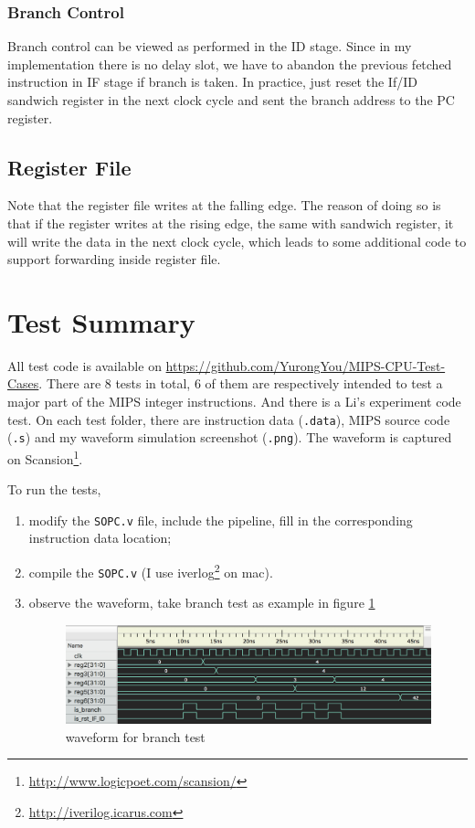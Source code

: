 \documentclass[paper=a4, fontsize=11pt]{scrartcl} %
\numberwithin{equation}{section} %
\numberwithin{figure}{section} %
\numberwithin{table}{section} %
\begin{document}
\begin{spacing}{1.5}
    	\subsubsection{Branch Control}
    		Branch control can be viewed as performed in the ID stage. Since in my implementation there is no delay slot, we have to abandon the previous fetched instruction in IF stage if branch is taken. In practice, just reset the If/ID sandwich register in the next clock cycle and sent the branch address to the PC register.
    \subsection{Register File}
    	Note that the register file writes at the falling edge. The reason of doing so is that if the register writes at the rising edge, the same with sandwich register, it will write the data in the next clock cycle, which leads to some additional code to support forwarding inside register file. 
\section{Test Summary}
	All test code is available on \url{https://github.com/YurongYou/MIPS-CPU-Test-Cases}. There are 8 tests in total, 6 of them are respectively intended to test a major part of the MIPS integer instructions. And there is a Li's experiment code test. On each test folder, there are instruction data (\verb|.data|), MIPS source code (\verb|.s|) and my waveform simulation screenshot (\verb|.png|). The waveform is captured on Scansion\footnote{\url{http://www.logicpoet.com/scansion/}}.
	
	To run the tests,
	\begin{enumerate}
		\item modify the \verb|SOPC.v| file, include the pipeline, fill in the corresponding instruction data location;
		\item compile the \verb|SOPC.v| (I use iverlog\footnote{\url{http://iverilog.icarus.com}} on mac).
		\item observe the waveform, take branch test as example in figure \ref{fig::branch}
		\begin{figure}[!htb]
			\centering
			\includegraphics[width = 13 cm]{branch}
			\caption{waveform for branch test}
			\label{fig::branch}
		\end{figure}
		

\end{enumerate}
\end{spacing}
\end{document}

